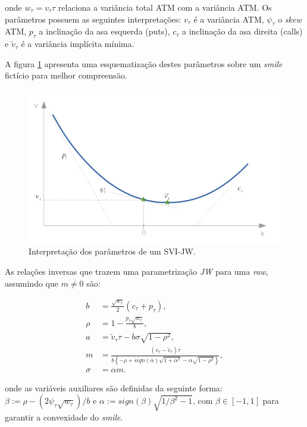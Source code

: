 \documentclass[]{book}
\theoremstyle{definition}
\theoremstyle{definition}
\theoremstyle{definition}
\theoremstyle{remark}
\begin{document}
onde \(w_\tau=v_\tau \tau\) relaciona a variância total ATM com a
variância ATM. Os parâmetros possuem as seguintes interpretações:
\(v_\tau\) é a variância ATM, \(\psi_\tau\) o \emph{skew} ATM,
\(p_\tau\) a inclinação da asa esquerda (puts), \(c_\tau\) a inclinação
da asa direita (calls) e \(\tilde v_\tau\) é a variância implícita
mínima.

A figura \ref{fig:svi-jw} apresenta uma esquematização destes parâmetros
sobre um \emph{smile} fictício para melhor compreensão.

\begin{figure}
\centering
\includegraphics{./images/svi_jw.png}
\caption{\label{fig:svi-jw}Interpretação dos parâmetros de um SVI-JW.}
\end{figure}

As relações inversas que trazem uma parametrização \emph{JW} para uma
\emph{raw}, assumindo que \(m \neq 0\) são:

\begin{align}
b&=\frac{\sqrt{w_\tau}}{2}(c_\tau+p_\tau),\\
\rho&=1-\frac{p_\tau\sqrt{w_\tau}}{b},\\
a&=\tilde v_\tau \tau-b\sigma\sqrt{1-\rho^2},\\
m&=\frac{(v_\tau-\tilde v_\tau)\tau}{b\left\lbrace-\rho+sign(\alpha)\sqrt{1+\alpha^2}-\alpha\sqrt{1-\rho^2}\right\rbrace},\\
\sigma&=\alpha m.
\label{eq:jw-to-raw}
\end{align}

onde as variáveis auxiliares são definidas da seguinte forma:
\(\beta:=\rho-(2\psi_\tau\sqrt{w_\tau})/b\) e
\(\alpha:=sign(\beta)\sqrt{1/\beta^2 - 1}\), com \(\beta \in [-1, 1]\)
para garantir a convexidade do \emph{smile}.
\end{document}
